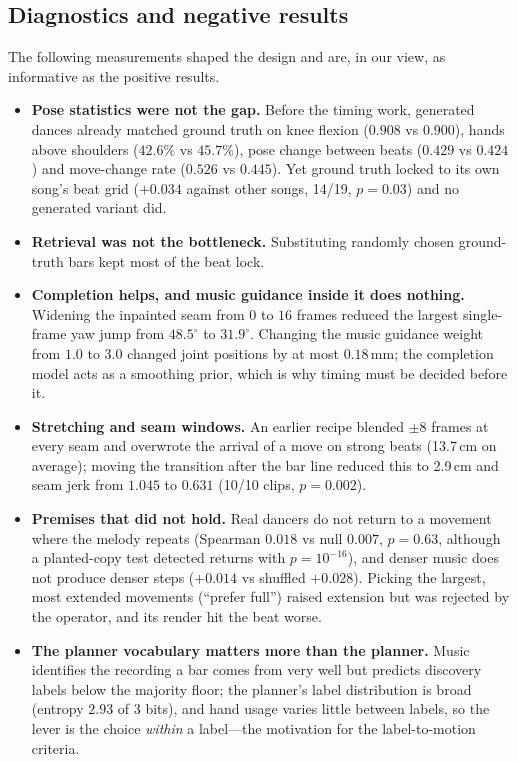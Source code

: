 \documentclass[10pt]{article}
\begin{document}
\subsection{Diagnostics and negative results}
\label{sec:ablation}

The following measurements shaped the design and are, in our view, as informative as the positive results.
\begin{itemize}
  \item \textbf{Pose statistics were not the gap.} Before the timing work, generated dances already matched ground truth on knee flexion ($0.908$ vs $0.900$), hands above shoulders ($42.6\%$ vs $45.7\%$), pose change between beats ($0.429$ vs $0.424$) and move-change rate ($0.526$ vs $0.445$). Yet ground truth locked to its own song's beat grid ($+0.034$ against other songs, 14/19, $p{=}0.03$) and no generated variant did.
  \item \textbf{Retrieval was not the bottleneck.} Substituting randomly chosen ground-truth bars kept most of the beat lock.
  \item \textbf{Completion helps, and music guidance inside it does nothing.} Widening the inpainted seam from $0$ to $16$ frames reduced the largest single-frame yaw jump from $48.5^\circ$ to $31.9^\circ$. Changing the music guidance weight from $1.0$ to $3.0$ changed joint positions by at most $0.18$\,mm; the completion model acts as a smoothing prior, which is why timing must be decided before it.
  \item \textbf{Stretching and seam windows.} An earlier recipe blended $\pm 8$ frames at every seam and overwrote the arrival of a move on strong beats (13.7\,cm on average); moving the transition after the bar line reduced this to 2.9\,cm and seam jerk from $1.045$ to $0.631$ (10/10 clips, $p{=}0.002$).
  \item \textbf{Premises that did not hold.} Real dancers do not return to a movement where the melody repeats (Spearman $0.018$ vs null $0.007$, $p{=}0.63$, although a planted-copy test detected returns with $p{=}10^{-16}$), and denser music does not produce denser steps ($+0.014$ vs shuffled $+0.028$). Picking the largest, most extended movements (``prefer full'') raised extension but was rejected by the operator, and its render hit the beat worse.
  \item \textbf{The planner vocabulary matters more than the planner.} Music identifies the recording a bar comes from very well but predicts discovery labels below the majority floor; the planner's label distribution is broad (entropy $2.93$ of $3$ bits), and hand usage varies little between labels, so the lever is the choice \emph{within} a label---the motivation for the label-to-motion criteria.
\end{itemize}
\end{document}
